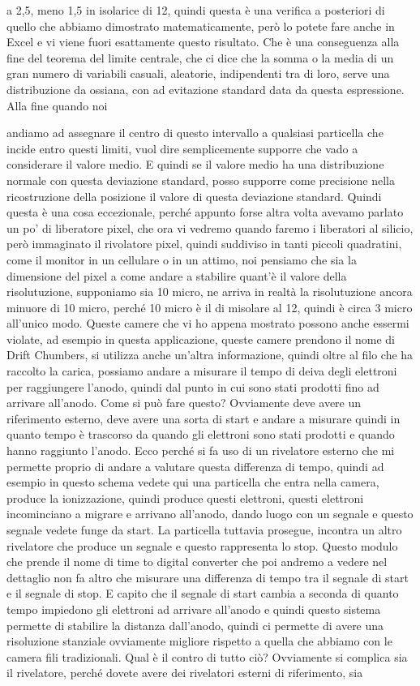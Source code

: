 {a 2,5, meno 1,5 in isolarice di 12, quindi questa è una verifica a posteriori di quello che abbiamo dimostrato matematicamente, però lo potete fare anche in Excel e vi viene fuori esattamente questo risultato. Che è una conseguenza alla fine del teorema del limite centrale, che ci dice che la somma o la media di un gran numero di variabili casuali, aleatorie, indipendenti tra di loro, serve una distribuzione da ossiana, con ad evitazione standard data da questa espressione. Alla fine quando noi 

andiamo ad assegnare il centro di questo intervallo a qualsiasi particella che incide entro questi limiti, vuol dire semplicemente supporre che vado a considerare il valore medio. E quindi se il valore medio ha una distribuzione normale con questa deviazione standard, posso supporre come precisione nella ricostruzione della posizione il valore di questa deviazione standard. Quindi questa è una cosa eccezionale, perché appunto forse altra volta avevamo parlato un po' di liberatore pixel, che ora vi vedremo quando faremo i liberatori al silicio, però immaginato il rivolatore pixel, quindi suddiviso in tanti piccoli quadratini, come il monitor in un cellulare o in un attimo, noi pensiamo che sia la dimensione del pixel a come andare a stabilire quant'è il valore della risolutuzione, supponiamo sia 10 micro, ne arriva in realtà la risolutuzione ancora minuore di 10 micro, perché 10 micro è il di misolare al 12, quindi è circa 3 micro all'unico modo. Queste camere che vi ho appena mostrato possono anche essermi violate, ad esempio in questa applicazione, queste camere prendono il nome di Drift Chumbers, si utilizza anche un'altra informazione, quindi oltre al filo che ha raccolto la carica, possiamo andare a misurare il tempo di deiva degli elettroni per raggiungere l'anodo, quindi dal punto in cui sono stati prodotti fino ad arrivare all'anodo. Come si può fare questo? Ovviamente deve avere un riferimento esterno, deve avere una sorta di start e andare a misurare quindi in quanto tempo è trascorso da quando gli elettroni sono stati prodotti e quando hanno raggiunto l'anodo. Ecco perché si fa uso di un rivelatore esterno che mi permette proprio di andare a valutare questa differenza di tempo, quindi ad esempio in questo schema vedete qui una particella che entra nella camera, produce la ionizzazione, quindi produce questi elettroni, questi elettroni incominciano a migrare e arrivano all'anodo, dando luogo con un segnale e questo segnale vedete funge da start. La particella tuttavia prosegue, incontra un altro rivelatore che produce un segnale e questo rappresenta lo stop. Questo modulo che prende il nome di time to digital converter che poi andremo a vedere nel dettaglio non fa altro che misurare una differenza di tempo tra il segnale di start e il segnale di stop. E capito che il segnale di start cambia a seconda di quanto tempo impiedono gli elettroni ad arrivare all'anodo e quindi questo sistema permette di stabilire la distanza dall'anodo, quindi ci permette di avere una risoluzione stanziale ovviamente migliore rispetto a quella che abbiamo con le camera fili tradizionali. Qual è il contro di tutto ciò? Ovviamente si complica sia il rivelatore, perché dovete avere dei rivelatori esterni di riferimento, sia }
